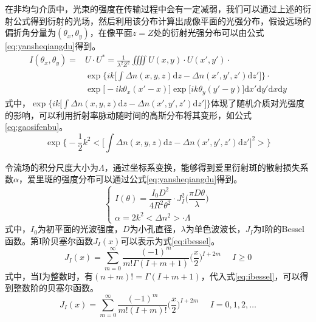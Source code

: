 在非均匀介质中，光束的强度在传输过程中会有一定减弱，我们可以通过上述的衍射公式得到衍射的光场，然后利用该分布计算出成像平面的光强分布，假设远场的偏折角分量为$(\theta_x,\theta_y)$，在像平面$z=Z$处的衍射光强分布\cite{qiong2013}可以由公式\eqref{eq:yansheqiangdu}得到。
\begin{equation}
\begin{aligned}
I(\theta_x,\theta_y)=&U\cdot U^*=\frac{1}{\lambda^2Z^2}\iiiint U(x,y)\cdot U(x',y')\cdot\\
&\exp\Big\{ik\Big[\int\Delta n(x,y,z)\text{d}z-\Delta n(x',y',z')\text{d}z'\Big]\Big\}\cdot\\
&\exp\big[-ik\theta_x(x'-x)\big]\exp\big[ik\theta_y(y'-y)\big]\text{d}x'\text{d}y'\text{d}x\text{d}y
\end{aligned}
\label{eq:yansheqiangdu}
\end{equation}
式中，$\exp\big\{ik\big[\int\Delta n(x,y,z)\text{d}z-\Delta n(x',y',z')\text{d}z'\big]\big\}$体现了随机介质对光强度的影响，可以利用折射率脉动随时间的高斯分布将其变形，如公式\eqref{eq:gaosifenbu}。
\begin{equation}
\exp\Big\{-\frac{1}{2}k^2<\Big[\int\Delta n(x,y,z)\text{d}z-\Delta n(x',y',z')\text{d}z'\Big]^2>\Big\}
\label{eq:gaosifenbu}
\end{equation}

令流场的积分尺度大小为$\Lambda$，通过坐标系变换，能够得到爱里衍射斑的散射损失系数$\alpha$，爱里斑的强度分布可以通过公式\eqref{eq:yansheqiangdu}得到。
\begin{equation}
\begin{cases}
I(\theta)=\dfrac{I_0D^2}{4R^2\theta^2}\cdot J_I^2\big(\dfrac{\pi D\theta}{\lambda}\big)\\
\alpha=2k^2<\Delta n^2>\cdot\Lambda
\end{cases}
\end{equation}
式中，$I_0$为初平面的光波强度，$D$为小孔直径，$\lambda$为单色波波长，$J_I$为I阶的Bessel函数。第I阶贝塞尔函数$J_I(x)$可以表示为式\eqref{eq:ibessel}。
\begin{equation}
J_I(x)=\sum\limits_{m=0}^{\infty}\frac{(-1)^m}{m!\Gamma(I+m+1)}\Big(\frac{x}{2}\Big)^{I+2m}~~~~~~I\geq0
\label{eq:ibessel}
\end{equation}
式中，当I为整数时，有$(n+m)!=\Gamma(I+m+1)$，代入式\eqref{eq:ibessel}，可以得到整数阶的贝塞尔函数。
\begin{equation}
J_I(x)=\sum\limits_{m=0}^{\infty}\frac{(-1)^m}{m!(I+m)!}\Big(\frac{x}{2}\Big)^{I+2m}~~~~~~I=0,1,2,\ldots
\label{eq:nbessel}
\end{equation}

